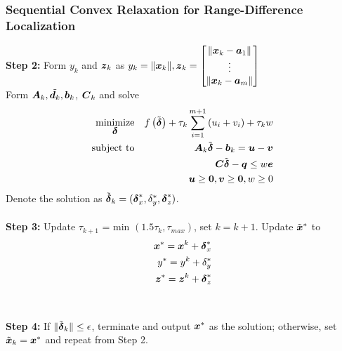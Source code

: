 \begin{frame} [t,allowframebreaks]
\frametitle{Sequential Convex Relaxation for Range-Difference Localization}
\phantom{m}
\textbf{Step 2:} Form $y_k$ and $\Bz_k$ as
$y_k =\|\Bx_k\|, \Bz_k = \begin{bmatrix}
\|\Bx_k - \Ba_1\| \\
\vdots \\
\|\Bx_k - \Ba_m\|
\end{bmatrix} $
\\ Form $\BA_k, \tilde{\Bd_k}, \Bb_k$, $\BC_k $  and solve
\begin{eqnarray} 
\nonumber
\Min_{\Bdelta}& &f\left(\tilde{\Bdelta}\right) + \tau_k\sum_{i=1}^{m+1} \left(u_i + v_i\right) +\tau_k w\\
\nonumber
\mbox{subject to}& &\BA_k\tilde{\Bdelta} - \Bb_k = \Bu - \Bv \\
\nonumber
& &\BC\tilde{\Bdelta} - \Bq \leq w\Be \\
\nonumber
& & \Bu \geq \symb{0}, \Bv \geq \symb{0}, w \geq 0
\end{eqnarray}
\noindent
Denote the solution as $\tilde{\Bdelta}_k = (\Bdelta_x^*, \delta_y^*, \Bdelta_z^*)$.  
\\~\\
\textbf{Step 3:} Update  $\tau_{k+1} $ = min $(1.5\tau_k, \tau_{max})$, set $k = k+1$. Update $\tilde{\Bx}^{*}$ to
\begin{eqnarray} 
\nonumber
\Bx^{*} = \Bx^k + \Bdelta_x^* \\
\nonumber
y^{*} = y^k + \delta_y^* \\
\nonumber
\Bz^{*} = \Bz^k + \Bdelta_z^*
\end{eqnarray}
\\~\\
\textbf{Step 4:} If $\|\tilde{\Bdelta}_k\| \leq \epsilon$, terminate and output $\Bx^*$ as the solution; otherwise, set $\tilde{\Bx}_{k} = \Bx^{*}$  and repeat from Step 2. 
\end{frame}


